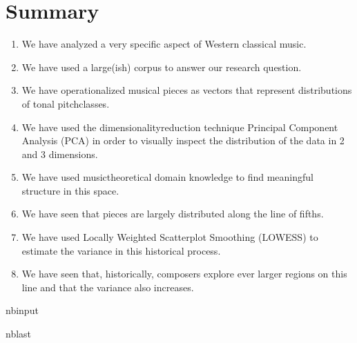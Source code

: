 \documentclass[letterpaper,10pt,english]{sphinxmanual}
\begin{document}
\section{Summary}
\label{\detokenize{05_data-driven_music_history:Summary}}\begin{enumerate}
%
\item {} 
\sphinxAtStartPar
We have analyzed a very specific aspect of Western classical music.

\item {} 
\sphinxAtStartPar
We have used a large(\sphinxhyphen{}ish) corpus to answer our research question.

\item {} 
\sphinxAtStartPar
We have operationalized musical pieces as vectors that represent distributions of tonal pitch\sphinxhyphen{}classes.

\item {} 
\sphinxAtStartPar
We have used the dimensionality\sphinxhyphen{}reduction technique Principal Component Analysis (PCA) in order to visually inspect the distribution of the data in 2 and 3 dimensions.

\item {} 
\sphinxAtStartPar
We have used music\sphinxhyphen{}theoretical domain knowledge to find meaningful structure in this space.

\item {} 
\sphinxAtStartPar
We have seen that pieces are largely distributed along the line of fifths.

\item {} 
\sphinxAtStartPar
We have used Locally Weighted Scatterplot Smoothing (LOWESS) to estimate the variance in this historical process.

\item {} 
\sphinxAtStartPar
We have seen that, historically, composers explore ever larger regions on this line and that the variance also increases.

\end{enumerate}

\begin{sphinxuseclass}{nbinput}
\begin{sphinxuseclass}{nblast}
{
\begin{sphinxVerbatim}[commandchars=\\\{\}]
\llap{\color{nbsphinxin}[ ]:\,\hspace{\fboxrule}\hspace{\fboxsep}}
\end{sphinxVerbatim}
}

\end{sphinxuseclass}
\end{sphinxuseclass}


\renewcommand{\indexname}{Index}
\printindex
\end{document}
